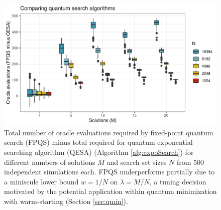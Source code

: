 \documentclass[12pt]{article} %
\begin{document}
 \begin{figure}[!t]
	\centering
	\includegraphics[width=0.7\linewidth]{searchComparison.pdf}
	\caption{Total number of oracle evaluations required by fixed-point quantum search (FPQS) \citep{yoder2014fixed} minus total required for quantum exponential searching algorithm (QESA) (Algorithm \ref{alg:expoSearch}) for different numbers of solutions $M$ and search set sizes $N$ from 500 independent simulations each.  FPQS underperforms partially due to a miniscule lower bound $w=1/N$ on $\lambda=M/N$, a tuning decision motivated by the potential application within quantum minimization with warm-starting (Section \ref{sec:qmin}).}\label{fig:comp}
\end{figure}
\end{document}
